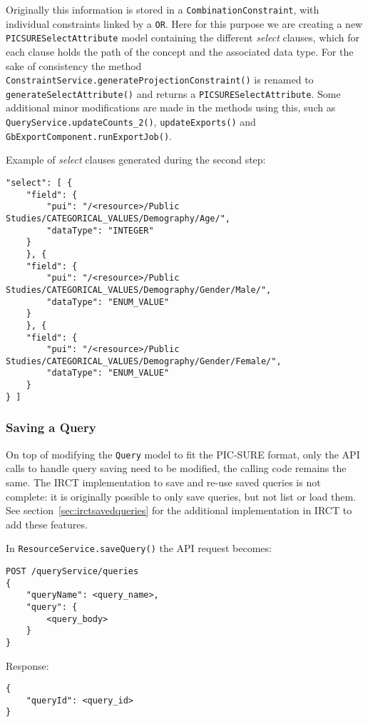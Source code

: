Originally this information is stored in a \verb|CombinationConstraint|, with individual constraints linked by a \verb|OR|.
Here for this purpose we are creating a new \verb|PICSURESelectAttribute| model containing the different \emph{select} clauses, which for each clause holds the path of the concept and the associated data type.
For the sake of consistency the method \verb|ConstraintService.generateProjectionConstraint()| is renamed to \verb|generateSelectAttribute()| and returns a \verb|PICSURESelectAttribute|.
Some additional minor modifications are made in the methods using this, such as \verb|QueryService.updateCounts_2()|, \verb|updateExports()| and \verb|GbExportComponent.runExportJob()|.

Example of \emph{select} clauses generated during the second step:
\begin{verbatim}
"select": [ {
    "field": {
        "pui": "/<resource>/Public Studies/CATEGORICAL_VALUES/Demography/Age/",
        "dataType": "INTEGER"
    }
    }, {
    "field": {
        "pui": "/<resource>/Public Studies/CATEGORICAL_VALUES/Demography/Gender/Male/",
        "dataType": "ENUM_VALUE"
    }
    }, {
    "field": {
        "pui": "/<resource>/Public Studies/CATEGORICAL_VALUES/Demography/Gender/Female/",
        "dataType": "ENUM_VALUE"
    }
} ]
\end{verbatim}


\subsubsection{Saving a Query}
On top of modifying the \verb|Query| model to fit the PIC-SURE format, only the API calls to handle query saving need to be modified, the calling code remains the same.
The IRCT implementation to save and re-use saved queries is not complete: it is originally possible to only save queries, but not list or load them. 
See section~\ref{sec:irctsavedqueries} for the additional implementation in IRCT to add these features.

In \verb|ResourceService.saveQuery()| the API request becomes:
\begin{verbatim}
POST /queryService/queries
{
    "queryName": <query_name>,
    "query": {
        <query_body>
    }
}    
\end{verbatim}

Response:
\begin{verbatim}
{
    "queryId": <query_id>
}    
\end{verbatim}

